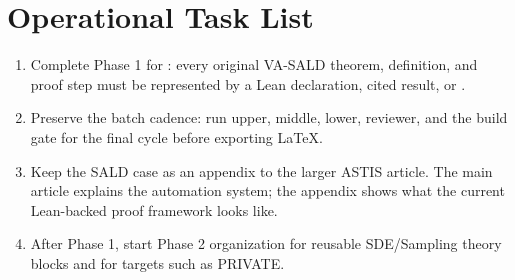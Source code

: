 \section{Operational Task List}

\begin{enumerate}
\item Complete Phase 1 for : every original VA-SALD
      theorem, definition, and proof step must be represented by a Lean
      declaration, cited result, or \ProofObligation{}.
\item Preserve the batch cadence: run upper, middle, lower, reviewer, and the
      build gate for the final cycle before exporting LaTeX.
\item Keep the SALD case as an appendix to the larger ASTIS article.  The main
      article explains the automation system; the appendix shows what the
      current Lean-backed proof framework looks like.
\item After Phase 1, start Phase 2 organization for reusable SDE/Sampling
      theory blocks and for  targets such as PRIVATE.
\end{enumerate}
